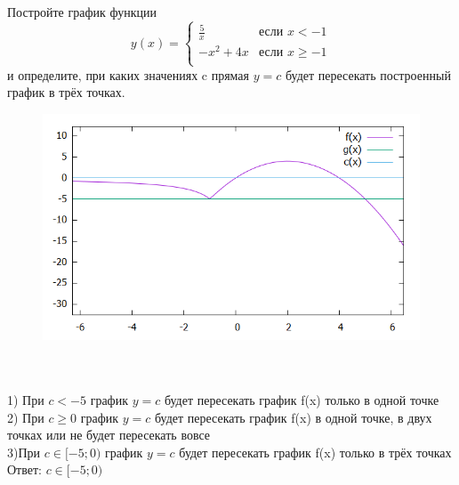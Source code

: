 \documentclass{article}
\begin{document}
	Постройте график функции\\
	\begin{equation*}
	y(x) = 
	\begin{cases}
	\frac{5}{x} &\text{если $x < -1$}\\
	-x^2+4x &\text{если $x \ge -1$}\\
	\end{cases}
	\end{equation*}
	и определите, при каких значениях c  прямая {$y=c$}   будет пересекать построенный график в трёх точках.\\
	\graphicspath{{Pictures/}}
	\begin{figure}[hb]
		\begin{center}
			\includegraphics[scale=0.5]{Graphic}
		\end{center}
	\end{figure}
	\\
	\\
	1) При {$c<-5$} график  {$y=c$} будет пересекать график f(x) только в одной точке\\
	2) При {$c \geq 0$}  график  {$y=c$} будет пересекать график f(x) в одной точке, в двух точках или не будет пересекать вовсе\\
	3)При {$c \in [-5;0)$} график  {$y=c$} будет пересекать график f(x) только в трёх точках\\
	Ответ: {$c \in [-5;0)$}
	
\end{document}
